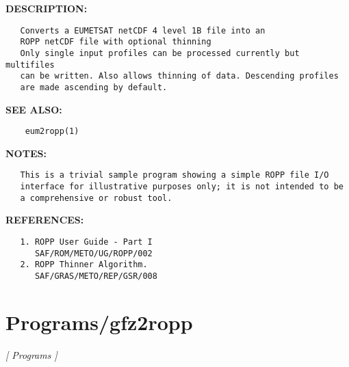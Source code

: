 \textbf{DESCRIPTION:}\hspace{0.08in}\begin{Verbatim}
   Converts a EUMETSAT netCDF 4 level 1B file into an
   ROPP netCDF file with optional thinning
   Only single input profiles can be processed currently but multifiles
   can be written. Also allows thinning of data. Descending profiles
   are made ascending by default.
\end{Verbatim}
\textbf{SEE ALSO:}\hspace{0.08in}\begin{Verbatim}
    eum2ropp(1)
\end{Verbatim}
\textbf{NOTES:}\hspace{0.08in}\begin{Verbatim}
   This is a trivial sample program showing a simple ROPP file I/O
   interface for illustrative purposes only; it is not intended to be
   a comprehensive or robust tool.
\end{Verbatim}
\textbf{REFERENCES:}\hspace{0.08in}\begin{Verbatim}
   1. ROPP User Guide - Part I
      SAF/ROM/METO/UG/ROPP/002
   2. ROPP Thinner Algorithm.
      SAF/GRAS/METO/REP/GSR/008
\end{Verbatim}
\section{Programs/gfz2ropp}
\textsl{[ Programs ]}

